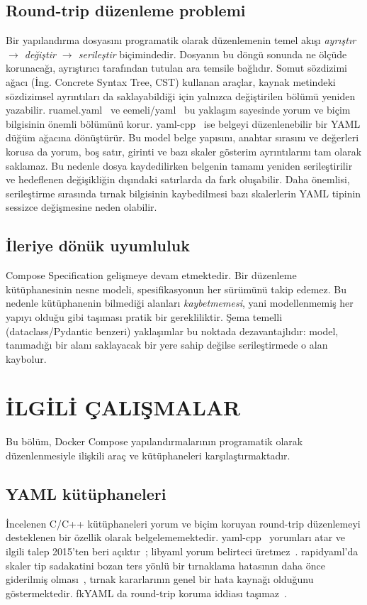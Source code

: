 \documentclass[12pt,a4paper]{article}
\begin{document}
\subsection{Round-trip düzenleme problemi}
Bir yapılandırma dosyasını programatik olarak düzenlemenin temel akışı
\emph{ayrıştır $\rightarrow$ değiştir $\rightarrow$ serileştir} biçimindedir.
Dosyanın bu döngü sonunda ne ölçüde korunacağı, ayrıştırıcı tarafından
tutulan ara temsile bağlıdır. Somut sözdizimi ağacı (İng. Concrete Syntax Tree, CST) kullanan araçlar,
kaynak metindeki sözdizimsel ayrıntıları da saklayabildiği için yalnızca
değiştirilen bölümü yeniden yazabilir. ruamel.yaml~\cite{ruamelyaml} ve
eemeli/yaml~\cite{eemeliyaml} bu yaklaşım sayesinde yorum ve biçim
bilgisinin önemli bölümünü korur. yaml-cpp~\cite{yamlcpp} ise belgeyi
düzenlenebilir bir YAML düğüm ağacına dönüştürür. Bu model belge yapısını,
anahtar sırasını ve değerleri korusa da yorum, boş satır, girinti ve bazı
skaler gösterim ayrıntılarını tam olarak saklamaz. Bu nedenle dosya
kaydedilirken belgenin tamamı yeniden serileştirilir ve hedeflenen
değişikliğin dışındaki satırlarda da fark oluşabilir. Daha önemlisi,
serileştirme sırasında tırnak bilgisinin kaybedilmesi bazı skalerlerin YAML
tipinin sessizce değişmesine neden olabilir.

\subsection{İleriye dönük uyumluluk}
Compose Specification gelişmeye devam etmektedir. Bir düzenleme
kütüphanesinin nesne modeli, spesifikasyonun her sürümünü takip edemez.
Bu nedenle kütüphanenin bilmediği alanları \emph{kaybetmemesi}, yani
modellenmemiş her yapıyı olduğu gibi taşıması pratik bir gerekliliktir.
Şema temelli (dataclass/Pydantic benzeri) yaklaşımlar bu noktada
dezavantajlıdır: model, tanımadığı bir alanı saklayacak bir yere sahip
değilse serileştirmede o alan kaybolur.

\section{İLGİLİ ÇALIŞMALAR}
\label{sec:ilgili-calismalar}

Bu bölüm, Docker Compose yapılandırmalarının programatik olarak düzenlenmesiyle
ilişkili araç ve kütüphaneleri karşılaştırmaktadır.

\subsection{YAML kütüphaneleri}
İncelenen C/C++ kütüphaneleri yorum ve biçim koruyan round-trip düzenlemeyi
desteklenen bir özellik olarak belgelememektedir. yaml-cpp~\cite{yamlcpp}
yorumları atar ve ilgili talep 2015'ten beri açıktır~\cite{yamlcpp_issue154,yamlcpp_issue457};
libyaml yorum belirteci üretmez~\cite{libyaml,libyaml_issue42}. rapidyaml'da
skaler tip sadakatini bozan ters yönlü bir tırnaklama hatasının daha önce
giderilmiş olması~\cite{rapidyaml,rapidyaml_issue30}, tırnak kararlarının
genel bir hata kaynağı olduğunu göstermektedir. fkYAML da round-trip koruma
iddiası taşımaz~\cite{fkyaml}.
\end{document}
